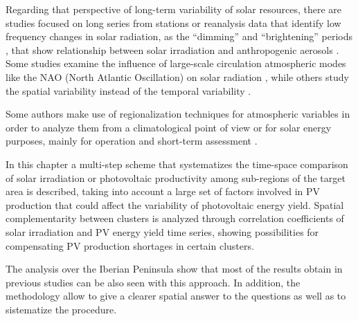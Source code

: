 Regarding that perspective of long-term variability of solar resources, there are studies focused on long series from stations \cite*{Sanchez-Lorenzo2009, Sanchez-Lorenzo2013, vazquez2012interannual} or reanalysis data that identify low frequency changes in solar radiation, as the “dimming” and “brightening” periods \cite*{Wild2005}, that show relationship between solar irradiation and anthropogenic aerosols \cite*{Nabat2014a}. Some studies examine the influence of large-scale circulation atmospheric modes like the NAO (North Atlantic Oscillation) on solar radiation \cite*{Pozo-Vazquez2004, Jerez2013}, while others study the spatial variability instead of the temporal variability \cite*{GueymardWilcox2011a}.

Some authors make use of regionalization techniques for atmospheric variables in order to analyze them from a climatological point of view \cite*{Argueso2011} or for solar energy purposes, mainly for operation and short-term assessment \cite*{Zagouras2013, Zagouras2014, Zagouras2014b}.

In this chapter a multi-step scheme that systematizes the time-space comparison of solar irradiation or photovoltaic productivity among sub-regions of the target area is described, taking into account a large set of factors involved in PV production that could affect the variability of photovoltaic energy yield. Spatial complementarity between clusters is analyzed through correlation coefficients of solar irradiation and PV energy yield time series, showing possibilities for compensating PV production shortages in certain clusters.

The analysis over the Iberian Peninsula show that most of the results obtain in previous studies can be also seen with this approach. In addition, the methodology allow to give a clearer spatial answer to the questions as well as to sistematize the procedure.


